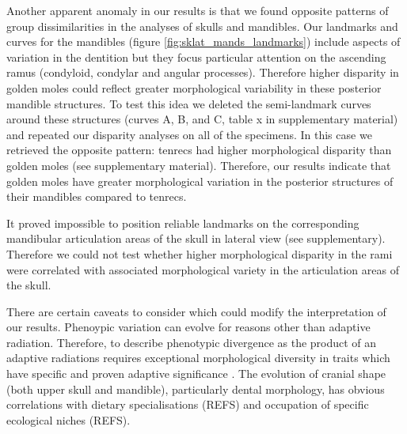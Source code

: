 \documentclass[12pt,a4paper]{article}
\begin{document}
	Another apparent anomaly in our results is that we found opposite patterns of group dissimilarities in the analyses of skulls and mandibles. 
	Our landmarks and curves for the mandibles (figure \ref{fig:sklat_mands_landmarks}) include aspects of variation in the dentition but they focus particular attention on the ascending ramus (condyloid, condylar and angular processes). Therefore higher disparity in golden moles could reflect greater morphological variability in these posterior mandible structures. To test this idea we deleted the semi-landmark curves around these structures (curves A, B, and C, table x in supplementary material) and repeated our disparity analyses on all of the specimens. In this case we retrieved the opposite pattern: tenrecs had higher morphological disparity than golden moles (see supplementary material).
	Therefore, our results indicate that golden moles have greater morphological variation in the posterior structures of their mandibles compared to tenrecs.
		
 	It proved impossible to position reliable landmarks on the corresponding mandibular articulation areas of the skull in lateral view (see supplementary). Therefore we could not test whether higher morphological disparity in the rami were correlated with associated morphological variety in the articulation areas of the skull.
	
	




	There are certain caveats to consider which could modify the interpretation of our results.
	Phenoypic variation can evolve for reasons other than adaptive radiation. Therefore, to describe phenotypic divergence as the product of an adaptive radiations requires exceptional morphological diversity in traits which have specific and proven adaptive significance \citep{Losos2010a}. The evolution of cranial shape (both upper skull and mandible), particularly dental morphology, has obvious correlations with dietary specialisations (REFS) and occupation of specific ecological niches (REFS). %
\end{document}
